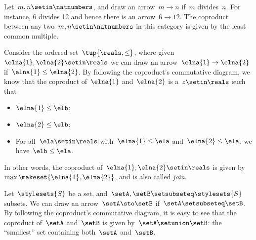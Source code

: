 \begin{example}
    Let~$m,n\setin \natnumbers$, and draw an arrow~$m\to n$ if~$m$ divides~$n$.
    For instance, 6 divides 12 and hence there is an arrow~$6\to 12$.
    The coproduct between any two~$m,n\setin \natnumbers$ in this category is given by the least common multiple.
\end{example}

\begin{example}
    Consider the ordered set~$\tup{\reals,\leq}$, where given~$\elna{1},\elna{2}\setin \reals$ we can draw an arrow~$\elna{1}\to \elna{2}$ if~$\elna{1}\leq \elna{2}$.
    By following the coproduct's commutative diagram, we know that the coproduct of~$\elna{1}$ and~$\elna{2}$ is a~$z\setin \reals$ such that
    \begin{itemize}
        \item $\elna{1}\leq \elb$;
        \item $\elna{2}\leq \elb$;
        \item For all~$\ela\setin \reals$ with~$\elna{1}\leq \ela$ and~$\elna{2}\leq \ela$, we have~$\elb\leq \ela$.
    \end{itemize}
    In other words, the coproduct of~$\elna{1},\elna{2}\setin \reals$ is given by~$\max\makeset{\elna{1},\elna{2}}$, and is also called \emph{join}.
\end{example}

\begin{example}
    \label{ex:subset_coprod}
    Let~$\stylesets{S}$ be a set, and~$\setA,\setB\setsubseteq \stylesets{S}$ subsets.
    We can draw an arrow~$\setA \sto \setB$ if~$\setA\setsubseteq \setB$.
    By following the coproduct's commutative diagram, it is easy to see that the coproduct of~$\setA$ and~$\setB$ is given by~$\setA\setunion\setB$: the ``smallest'' set containing both~$\setA$ and~$\setB$.
\end{example}

